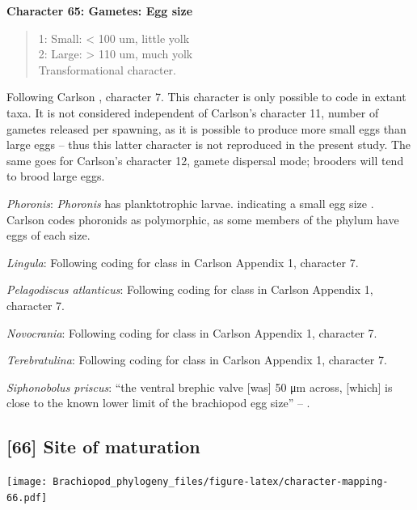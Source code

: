 \documentclass[openany]{book}
\theoremstyle{definition}
\theoremstyle{definition}
\theoremstyle{definition}
\theoremstyle{remark}
\begin{document}
\textbf{Character 65: Gametes: Egg size}

\begin{quote}
1: Small: \textless{} 100 um, little yolk\\
2: Large: \textgreater{} 110 um, much yolk\\
Transformational character.
\end{quote}

Following Carlson \citeyearpar{Carlson1995Phylogeneticrelationships},
character 7. This character is only possible to code in extant taxa. It
is not considered independent of Carlson's character 11, number of
gametes released per spawning, as it is possible to produce more small
eggs than large eggs -- thus this latter character is not reproduced in
the present study. The same goes for Carlson's character 12, gamete
dispersal mode; brooders will tend to brood large eggs.

\emph{Phoronis}: \emph{Phoronis} has planktotrophic larvae. indicating a
small egg size \citep{Ruppert2004}. Carlson
\citeyearpar{Carlson1995Phylogeneticrelationships} codes phoronids as
polymorphic, as some members of the phylum have eggs of each size.

\emph{Lingula}: Following coding for class in Carlson
\citeyearpar{Carlson1995Phylogeneticrelationships} Appendix 1, character
7.

\emph{Pelagodiscus atlanticus}: Following coding for class in Carlson
\citeyearpar{Carlson1995Phylogeneticrelationships} Appendix 1, character
7.

\emph{Novocrania}: Following coding for class in Carlson
\citeyearpar{Carlson1995Phylogeneticrelationships} Appendix 1, character
7.

\emph{Terebratulina}: Following coding for class in Carlson
\citeyearpar{Carlson1995Phylogeneticrelationships} Appendix 1, character
7.

\emph{Siphonobolus priscus}: ``the ventral brephic valve {[}was{]} 50 μm
across, {[}which{]} is close to the known lower limit of the brachiopod
egg size'' -- \citet{Popov2009Earlyontogeny}.

\hypertarget{site-of-maturation}{%
\subsection*{{[}66{]} Site of maturation}\label{site-of-maturation}}

\texttt{[image: Brachiopod\_phylogeny\_files/figure-latex/character-mapping-66.pdf]}
\end{document}
